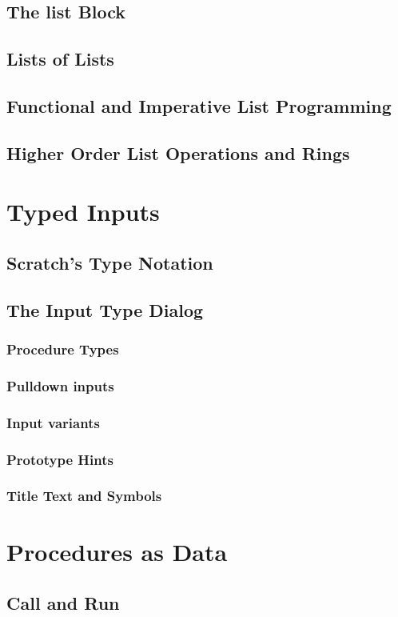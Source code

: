 \documentclass{report}
\begin{document}
\section{The list Block}
\section{Lists of Lists}
\section{Functional and Imperative List Programming}
\section{Higher Order List Operations and Rings}
\chapter{Typed Inputs}
\section{Scratch's Type Notation}
\section{The \Snap{} Input Type Dialog}
\subsection{Procedure Types}
\subsection{Pulldown inputs}
\subsection{Input variants}
\subsection{Prototype Hints}
\subsection{Title Text and Symbols}
\chapter{Procedures as Data}
\section{Call and Run}
\end{document}
